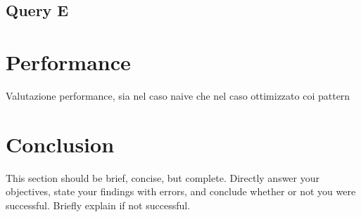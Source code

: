 \documentclass[runningheads]{llncs}
\begin{document}
\subsection{Query E}

\section{Performance}
Valutazione performance, sia nel caso naive che nel caso ottimizzato coi pattern

\section{Conclusion}
This section should be brief, concise, but complete. Directly answer your objectives, state your findings with errors, and conclude whether or not you were successful. Briefly explain if not successful.
\end{document}
